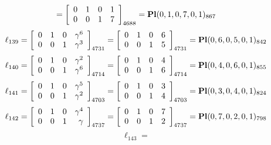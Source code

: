 \documentclass{article}
\begin{document}
{$$=
\left[
\begin{array}{*{4}c}
0  & 1  & 0  & 1\\
0  & 0  & 1  & 7\\
\end{array}
\right]_{4688}
={\rm\bf Pl}(0,1,0,7,0,1 )_{867}$$
$$
\ell_{139} = 
\left[
\begin{array}{*{4}{r}}
0 & 1 & 0 & \gamma^{6}\\
0 & 0 & 1 & \gamma^{3}\\
\end{array}
\right]
_{4731}
=
\left[
\begin{array}{*{4}c}
0  & 1  & 0  & 6\\
0  & 0  & 1  & 5\\
\end{array}
\right]_{4731}
={\rm\bf Pl}(0,6,0,5,0,1 )_{842}$$
$$
\ell_{140} = 
\left[
\begin{array}{*{4}{r}}
0 & 1 & 0 & \gamma^{2}\\
0 & 0 & 1 & \gamma^{6}\\
\end{array}
\right]
_{4714}
=
\left[
\begin{array}{*{4}c}
0  & 1  & 0  & 4\\
0  & 0  & 1  & 6\\
\end{array}
\right]_{4714}
={\rm\bf Pl}(0,4,0,6,0,1 )_{855}$$
$$
\ell_{141} = 
\left[
\begin{array}{*{4}{r}}
0 & 1 & 0 & \gamma^{5}\\
0 & 0 & 1 & \gamma^{2}\\
\end{array}
\right]
_{4703}
=
\left[
\begin{array}{*{4}c}
0  & 1  & 0  & 3\\
0  & 0  & 1  & 4\\
\end{array}
\right]_{4703}
={\rm\bf Pl}(0,3,0,4,0,1 )_{824}$$
$$
\ell_{142} = 
\left[
\begin{array}{*{4}{r}}
0 & 1 & 0 & \gamma^{4}\\
0 & 0 & 1 & \gamma \\
\end{array}
\right]
_{4737}
=
\left[
\begin{array}{*{4}c}
0  & 1  & 0  & 7\\
0  & 0  & 1  & 2\\
\end{array}
\right]_{4737}
={\rm\bf Pl}(0,7,0,2,0,1 )_{798}$$
$$
\ell_{143} = 
$$}
\end{document}
